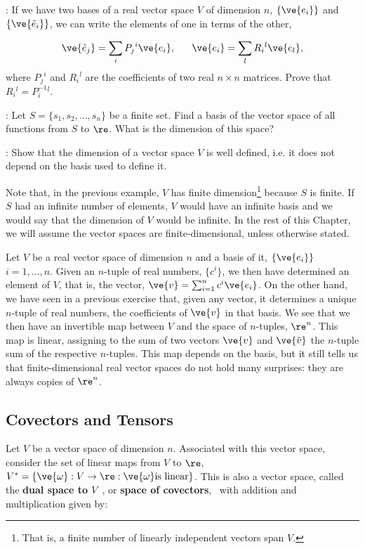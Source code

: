 \ejer: If we have two bases of a real vector space $V$ of dimension $n$, $\{\ve{e_i}\}$ and $\{\ve{\tilde{e}_i}\}$, we can write the elements of one in terms of the other, 

\[
\ve{\tilde{e}_j} = \sum_i P_{j}{}^i \ve{e_i}, \;\;\;\;\;\; \ve{e_i} = \sum_l R_{i}{}^l \ve{e_l},
\]
%
where $P_{j}{}^i$ and $R_{i}{}^l$ are the coefficients of two real $n \times n$ matrices. Prove that $R_{i}{}^l = P^{-1}_{i}{}^l $.

\ejer:
Let $S = \{s_1,s_2,\dots,s_n\}$ be a finite set. Find a basis 
of the vector space of all functions from $S$ to $\re$. 
What is the dimension of this space?

\ejer: Show that the dimension of a vector space $V$ is well defined, i.e. it does not depend on
the basis used to define it. 

Note that, in the previous example, $V$ has finite dimension\footnote{That is, a finite number of linearly independent vectors span $V$.} because $S$ is finite. If $S$
had an infinite number of elements, $V$ would have an infinite basis and we would say that the dimension of $V$ would be infinite. In the rest of this Chapter, we will assume the vector spaces are finite-dimensional, unless otherwise stated.

Let $V$ be a real vector space of dimension $n$ and a basis of it, $\{\ve{e_i}\}$ $i=1, \ldots ,n$. 
Given an $n$-tuple of real numbers, $\{c^{i}\}$, we then have determined an element of $V$, 
that is, the vector,  $\ve{v}=\sum_{i=1}^{n} c^{i}\ve{e_i}$. 
On the other hand, we have seen in a previous exercise that, given any vector, it determines a unique $n$-tuple of real numbers, the coefficients of $\ve{v}$ in that basis. 
We see that we then have an invertible map between $V$ and the space of $n$-tuples, $\re^{n}$.
This map is linear, assigning to the sum of two vectors $\ve{v}$ and $\ve{\tilde{v}}$ the $n$-tuple sum of the respective $n$-tuples. This map depends on the basis, but it still tells us that finite-dimensional real vector spaces do not hold many surprises: they are always copies of $\re^{n}$.

\subsection{Covectors and Tensors}
\label{sub:Covectors_and_Tensors}

Let $V$ be a vector space of dimension $n$. 
Associated with this vector space, consider the set of linear maps from $V$ to $\re$,
$V^*=\{\ve{\omega}:V\to \re : \ve{\omega} \text{is linear}\}$. 
This is also a vector space, called the {\bf dual space to $V$}~, 
or {\bf space of covectors},~ with addition and multiplication given by: 

